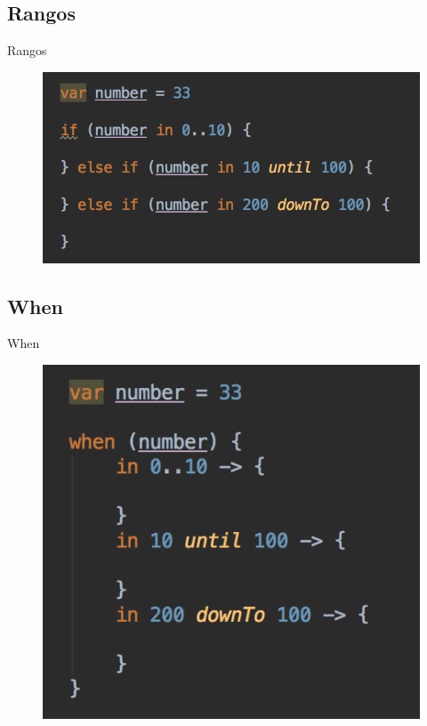 \subsection{Rangos}
\begin{frame}{Rangos}{}
    \begin{figure}[h]
    \centering
    \includegraphics[width=\textwidth]{images/kotlin_vs_java/ranges}
    \end{figure}
\end{frame}

\subsection{When}
\begin{frame}{When}{}
    \begin{figure}[h]
    \centering
    \includegraphics[width=\textwidth]{images/kotlin_vs_java/when}
    \end{figure}
\end{frame}


